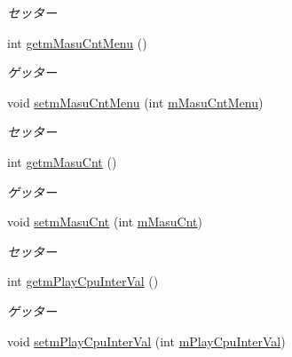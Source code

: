 \begin{DoxyCompactItemize}
\begin{DoxyCompactList}\small\item\em セッター \end{DoxyCompactList}\item 
int \hyperlink{classjp_1_1gr_1_1java__conf_1_1yuta__yoshinaga_1_1reversi_1_1model_1_1_reversi_setting_a8db0caa8f0a20b5f39441dc02618eb49}{getm\+Masu\+Cnt\+Menu} ()
\begin{DoxyCompactList}\small\item\em ゲッター \end{DoxyCompactList}\item 
void \hyperlink{classjp_1_1gr_1_1java__conf_1_1yuta__yoshinaga_1_1reversi_1_1model_1_1_reversi_setting_a599fd0c62bcfdda1988f4eeb9d4642a6}{setm\+Masu\+Cnt\+Menu} (int \hyperlink{classjp_1_1gr_1_1java__conf_1_1yuta__yoshinaga_1_1reversi_1_1model_1_1_reversi_setting_ae6550303cca3580b0ff04825586341a4}{m\+Masu\+Cnt\+Menu})
\begin{DoxyCompactList}\small\item\em セッター \end{DoxyCompactList}\item 
int \hyperlink{classjp_1_1gr_1_1java__conf_1_1yuta__yoshinaga_1_1reversi_1_1model_1_1_reversi_setting_a6d13d516a1c7eb51d781286ddf5ea2fb}{getm\+Masu\+Cnt} ()
\begin{DoxyCompactList}\small\item\em ゲッター \end{DoxyCompactList}\item 
void \hyperlink{classjp_1_1gr_1_1java__conf_1_1yuta__yoshinaga_1_1reversi_1_1model_1_1_reversi_setting_a5c7e103749ac244e57e6ab2dabde80b9}{setm\+Masu\+Cnt} (int \hyperlink{classjp_1_1gr_1_1java__conf_1_1yuta__yoshinaga_1_1reversi_1_1model_1_1_reversi_setting_adeddbbf58c4af809abf5268c03c44891}{m\+Masu\+Cnt})
\begin{DoxyCompactList}\small\item\em セッター \end{DoxyCompactList}\item 
int \hyperlink{classjp_1_1gr_1_1java__conf_1_1yuta__yoshinaga_1_1reversi_1_1model_1_1_reversi_setting_acb1d20bc2dde58ec73e17bbe960cd218}{getm\+Play\+Cpu\+Inter\+Val} ()
\begin{DoxyCompactList}\small\item\em ゲッター \end{DoxyCompactList}\item 
void \hyperlink{classjp_1_1gr_1_1java__conf_1_1yuta__yoshinaga_1_1reversi_1_1model_1_1_reversi_setting_ae2c0f9f922618dfaf5da9050362dcb2d}{setm\+Play\+Cpu\+Inter\+Val} (int \hyperlink{classjp_1_1gr_1_1java__conf_1_1yuta__yoshinaga_1_1reversi_1_1model_1_1_reversi_setting_aaaab5dc7fb0d61fe05466a07d8cf6f41}{m\+Play\+Cpu\+Inter\+Val})

\end{DoxyCompactItemize}
